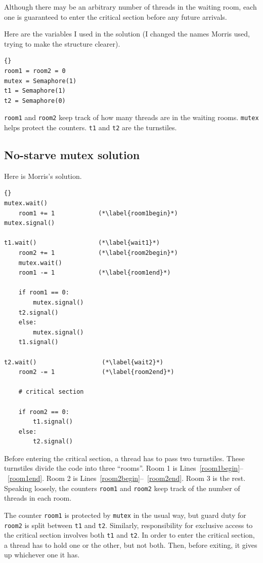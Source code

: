 \documentclass{book}
\newcommand{\clearemptydoublepage}{\newpage\cleardoublepage}
\begin{document}
Although there may be an arbitrary number of threads in the waiting
room, each one is guaranteed to enter the critical section before any
future arrivals.

Here are the variables I used in the solution (I changed the
names Morris used, trying to make the structure clearer).

\begin{lstlisting}[caption={No-starve mutex hint}]{}
room1 = room2 = 0
mutex = Semaphore(1)
t1 = Semaphore(1)
t2 = Semaphore(0)
\end{lstlisting}

{\tt room1} and {\tt room2} keep track of how many threads are in the
waiting rooms.  {\tt mutex} helps protect the counters.  {\tt t1} and
{\tt t2} are the turnstiles.


\clearemptydoublepage
\subsection{No-starve mutex solution}

Here is Morris's solution.

\begin{lstlisting}[caption={Morris's algorithm}]{}
mutex.wait()
    room1 += 1            (*\label{room1begin}*)
mutex.signal()
                           
t1.wait()                 (*\label{wait1}*)
    room2 += 1            (*\label{room2begin}*)
    mutex.wait()
    room1 -= 1            (*\label{room1end}*)

    if room1 == 0: 
        mutex.signal()
	t2.signal()
    else: 
        mutex.signal()
	t1.signal()

t2.wait()                  (*\label{wait2}*)
    room2 -= 1             (*\label{room2end}*)

    # critical section

    if room2 == 0:
        t1.signal()
    else:
        t2.signal()
\end{lstlisting}

Before entering the critical section, a thread has to pass two
turnstiles.  These turnstiles divide the code into three ``rooms''.
Room 1 is Lines~\ref{room1begin}--~\ref{room1end}.  Room 2 is
Lines~\ref{room2begin}--~\ref{room2end}.  Room 3 is the rest.
Speaking loosely, the counters {\tt room1} and {\tt room2} keep track
of the number of threads in each room.

The counter {\tt room1} is protected by {\tt mutex} in the usual way,
but guard duty for {\tt room2} is split between {\tt t1} and {\tt t2}.
Similarly, responsibility for exclusive access to the critical section
involves both {\tt t1} and {\tt t2}.  In order to enter the critical
section, a thread has to hold one or the other, but not both.  Then,
before exiting, it gives up whichever one it has.
\end{document}
